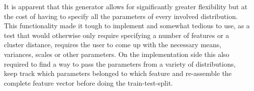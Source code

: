 It is apparent that this generator allows for significantly greater flexibility but at the cost of having to specify all the parameters of every involved distribution.
This functionality made it tough to implement and somewhat tedious to use, as a test that would otherwise only require specifying a number of features or a cluster distance,
requires the user to come up with the necessary means, variances, scales or other parameters.
On the implementation side this also required to find a way to pass the parameters from a variety of distributions, keep track which parameters belonged to which feature
and re-assemble the complete feature vector before doing the train-test-split. 

